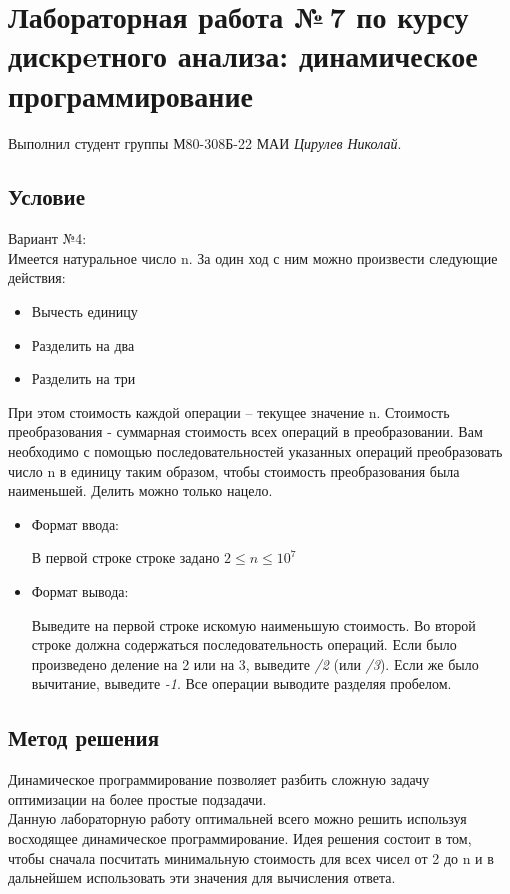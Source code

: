 \documentclass[12pt]{article}
\begin{document}
\section*{Лабораторная работа №\,7 по курсу дискрeтного анализа: динамическое программирование}

Выполнил студент группы М80-308Б-22 МАИ \textit{Цирулев Николай}.

\subsection*{Условие}
Вариант №4:\\
Имеется натуральное число n. За один ход с ним можно произвести следующие действия:
\begin{itemize}
\item
    Вычесть единицу
\item
    Разделить на два
\item
    Разделить на три
\end{itemize}
При этом стоимость каждой операции – текущее значение n. Стоимость преобразования - суммарная стоимость всех операций в преобразовании. Вам необходимо с помощью последовательностей указанных операций преобразовать число n в единицу таким образом, чтобы стоимость преобразования была наименьшей. Делить можно только нацело. 
\begin{itemize}
\item
    Формат ввода:
    
    В первой строке строке задано $2 \leq n \leq 10^{7}$

\item
    Формат вывода:
    
    Выведите на первой строке искомую наименьшую стоимость. Во второй строке должна содержаться последовательность операций. Если было произведено деление на 2 или на 3, выведите \textit{/2} (или \textit{/3}). Если же было вычитание, выведите \textit{-1}. Все операции выводите разделяя пробелом.
\end{itemize}

\subsection*{Метод решения}
Динамическое программирование позволяет разбить сложную задачу оптимизации на более простые подзадачи. \\
Данную лабораторную работу оптимальней всего можно решить используя восходящее динамическое программирование. Идея решения состоит в том, чтобы сначала посчитать минимальную стоимость для всех чисел от 2 до n и в дальнейшем использовать эти значения для вычисления ответа.
\end{document}

